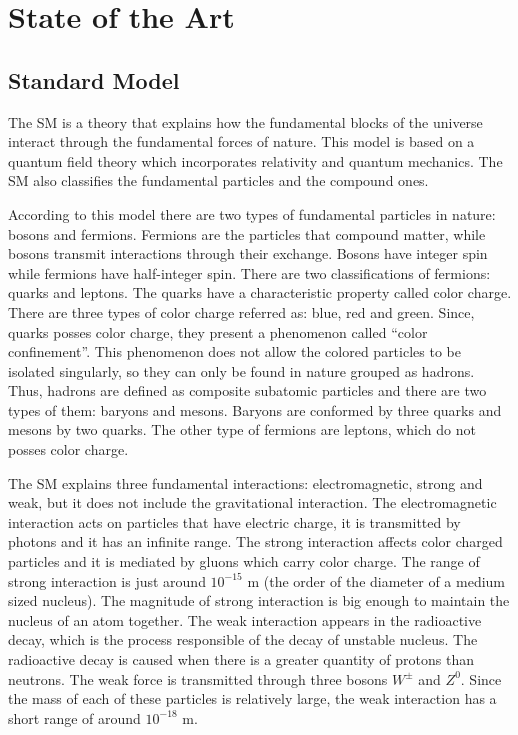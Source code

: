 \chapter{State of the Art} 
\label{State_Art_chapter}

\section{Standard Model}

The SM is a theory that explains how the fundamental blocks of the universe interact through the fundamental forces of nature. This model is based on a quantum field theory which incorporates relativity and quantum mechanics. The SM also classifies the fundamental particles and the compound ones. 

According to this model there are two types of fundamental particles in nature: bosons and fermions. Fermions are the particles that compound matter, while bosons transmit interactions through their exchange. Bosons have integer spin while fermions have half-integer spin. There are two classifications of fermions: quarks and leptons. The quarks have a characteristic property called color charge. There are three types of color charge referred as: blue, red and green. Since, quarks posses color charge, they present a phenomenon called ``color confinement''. This phenomenon does not allow the colored particles to be isolated singularly, so they can only be found in nature grouped as hadrons. Thus, hadrons are defined as composite subatomic particles and there are two types of them: baryons and mesons. Baryons are conformed by three quarks and mesons by two quarks. The other type of fermions are leptons, which do not posses color charge.

The SM explains three fundamental interactions: electromagnetic, strong and weak, but it does not include the gravitational interaction. The electromagnetic interaction acts on particles that have electric charge, it is transmitted by photons and it has an infinite range. The strong interaction affects color charged particles and it is mediated by gluons which carry color charge. The range of strong interaction is just around $10^{-15}$ m (the order of the diameter of a medium sized nucleus). The magnitude of strong interaction is big enough to maintain the nucleus of an atom together. The weak interaction appears in the radioactive decay, which is the process responsible of the decay of unstable nucleus. The radioactive decay is caused when there is a greater quantity of protons than neutrons. The weak force is transmitted through three bosons $W^{\pm}$ and $Z^0$. Since the mass of each of these particles is relatively large, the weak interaction has a short range of around $10^{-18}$ m. 

